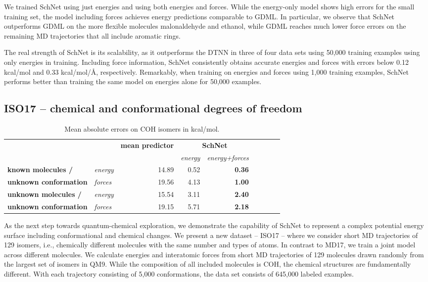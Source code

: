 \documentclass{article}
\begin{document}
We trained SchNet using just energies and using both energies and forces.
While the energy-only model shows high errors for the small training set, the model including forces achieves energy predictions comparable to GDML.
In particular, we observe that SchNet outperforms GDML on the more flexible molecules malonaldehyde and ethanol, while GDML reaches much lower force errors on the remaining MD trajectories that all include aromatic rings.

The real strength of SchNet is its scalability, as it outperforms the DTNN in three of four data sets using 50,000 training examples using only energies in training.
Including force information, SchNet consistently obtains accurate energies and forces with errors below 0.12 kcal/mol and 0.33 kcal/mol/{\AA}, respectively. 
Remarkably, when training on energies and forces using 1,000 training examples, SchNet performs better than training the same model on energies alone for 50,000 examples.

\subsection{ISO17 -- chemical and conformational degrees of freedom}
\begin{table}
\caption{Mean absolute errors on COH isomers in kcal/mol.}\label{tab:isomer}
\centering
\small
\begin{tabular}{llrrrrrrr}
\toprule
 & & \textbf{mean predictor} & \multicolumn{2}{c}{\textbf{SchNet}} \\
 & &                         & \textit{energy} & \textit{energy+forces} \\ \midrule
\textbf{known molecules /} &   \textit{energy}   & 14.89 & 0.52 & \textbf{0.36}\\
\textbf{unknown conformation} & \textit{forces} & 19.56 & 4.13 & \textbf{1.00} \\ \midrule
\textbf{unknown molecules /} & \textit{energy}   & 15.54 & 3.11 & \textbf{2.40} \\
\textbf{unknown conformation} & \textit{forces} & 19.15 & 5.71 & \textbf{2.18} \\
\bottomrule
\end{tabular}
\end{table}
As the next step towards quantum-chemical exploration, we demonstrate the capability of SchNet to represent a complex potential energy surface including conformational and chemical changes.
We present a new dataset -- ISO17 -- where we consider short MD trajectories of 129 isomers, i.e., chemically different molecules with the same number and types of atoms.
In contrast to MD17, we train a joint model across different molecules.
We calculate energies and interatomic forces from short MD trajectories of 129 molecules drawn randomly from the largest set of isomers in QM9.
While the composition of all included molecules is COH, the chemical structures are fundamentally different.
With each trajectory consisting of 5,000 conformations, the data set consists of 645,000 labeled examples.
\end{document}

